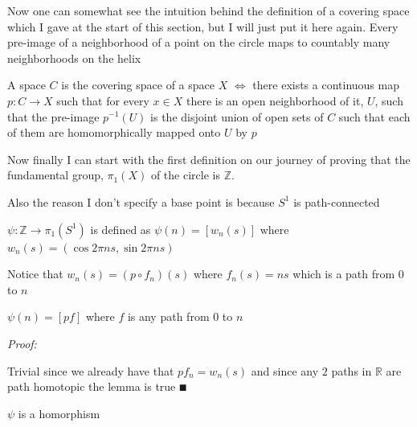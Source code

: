 \documentclass[paper=a4,fontsize=paper,12.5pt]{book}
\newcommand{\3}{\vspace*{3mm}}
\newcommand{\Proof}{\textit{Proof:}}
\newcommand{\IFF}{$\Longleftrightarrow$ \hspace*{.5mm}}
\newcommand{\fund}[1]{{\pi}_{1}(#1)}
\newcommand{\A}{\fund{\C{1}}}
\newcommand{\Z}{\mathbb{Z}}
\newcommand{\R}{\mathbb{R}}
\newcommand{\C}[1]{{S}^{#1}}
\begin{document}
\3

Now one can somewhat see the intuition behind the definition of a covering space which I gave at the start of this section, but I will just put it here again. Every pre-image of a neighborhood of a point on the circle maps to countably many neighborhoods on the helix

\3

\begin{definition}

A space $C$ is the covering space of a space $X$ \IFF there exists a continuous map $p:C \to X$ such that for every $x \in X$ there is an open neighborhood of it, $U$, such that the pre-image ${p}^{-1}(U)$ is the disjoint union of open sets of $C$ such that each of them are homomorphically mapped onto $U$ by $p$


\end{definition}

\3

Now finally I can start with the first definition on our journey of proving that the fundamental group, ${\pi}_{1}(X)$ of the circle is $\Z$. 

\3

Also the reason I don't specify a base point is because $\C{1}$ is path-connected

\3

\begin{definition}

$\psi: \Z \to \A$ is defined as $\psi(n) = [{w}_{n}(s)]$ where ${w}_{n}(s) = (\cos 2\pi ns, \sin 2\pi ns)$

\3

Notice that ${w}_{n}(s) = (p \circ {f}_{n})(s)$ where ${f}_{n}(s) = ns$ which is a path from $0$ to $n$

\end{definition}

\3

\begin{lemma}

$\psi(n) = [pf]$ where $f$ is any path from $0$ to $n$


\end{lemma}

\Proof

Trivial since we already have that $p{f}_{n} = {w}_{n}(s)$ and since any $2$ paths in $\R$ are path homotopic the lemma is true $\QED$

\3

\begin{lemma}

$\psi$ is a homorphism


\end{lemma} 
\end{document}
